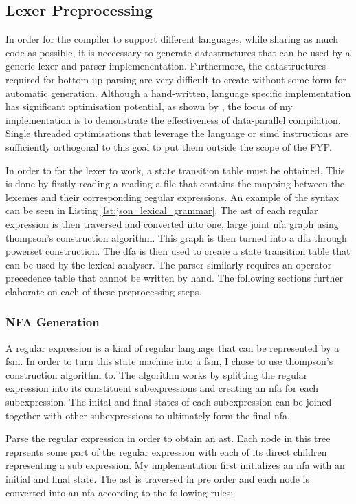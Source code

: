 \subsection{Lexer Preprocessing}

In order for the compiler to support different languages, while sharing as much code as possible,
it is neccessary to generate datastructures that can be used by a generic lexer and parser
implemenentation. Furthermore, the datastructures required for bottom-up parsing are very difficult
to create without some form for automatic generation. Although a hand-written, language specific
implementation has significant optimisation potential, as shown by \cite{langdale_parsing_2019},
the focus of my implementation is to demonstrate the effectiveness of data-parallel compilation.
Single threaded optimisations that leverage the language or \gls{simd} instructions are sufficiently
orthogonal to this goal to put them outside the scope of the FYP. 

In order to for the lexer to work, a state transition table must be obtained. This is
done by firstly reading a reading a file that contains the mapping between the lexemes and
their corresponding regular expressions. An example of the syntax can be seen in Listing
\ref{lst:json_lexical_grammar}. The \gls{ast} of each regular expression is then traversed and
converted into one, large joint \gls{nfa} graph using thompson's construction algorithm. This graph
is then turned into a \gls{dfa} through powerset construction. The \gls{dfa} is then used to create
a state transition table that can be used by the lexical analyser. The parser similarly requires an
operator precedence table that cannot be written by hand. The following sections further elaborate
on each of these preprocessing steps.

\subsubsection{NFA Generation}
A regular expression is a kind of regular language that can be represented by a \gls{fsm}. In
order to turn this state machine into a \gls{fsm}, I chose to use thompson's construction algorithm
to. The algorithm works by splitting the regular expression into its constituent subexpressions and creating an \gls{nfa} for each subexpression. The inital and final states of each subexpression can be joined together with other subexpressions to ultimately form the final \gls{nfa}. 

Parse the regular expression in order to obtain an \gls{ast}. Each node in this tree reprsents some part of the regular expression with each of its direct children representing a sub expression. My implementation first initializes an \gls{nfa} with an initial and final state. The \gls{ast} is traversed in pre order and each node is converted into an \gls{nfa} according to the following rules:
